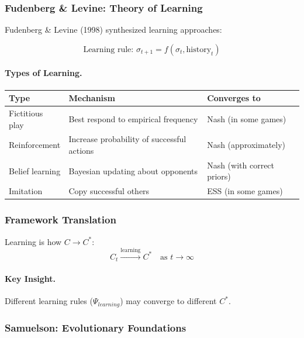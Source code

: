 \subsubsection{Fudenberg \& Levine: Theory of Learning}

Fudenberg \& Levine (1998) synthesized learning approaches:

\begin{equation}
\boxed{
\text{Learning rule: } \sigma_{t+1} = f(\sigma_t, \text{history}_t)
}
\label{eq:learning}
\end{equation}

\paragraph{Types of Learning.}
\begin{center}
\renewcommand{\arraystretch}{1.3}
\begin{tabular}{|l|l|l|}
\hline
\textbf{Type} & \textbf{Mechanism} & \textbf{Converges to} \\
\hline
Fictitious play & Best respond to empirical frequency & Nash (in some games) \\
Reinforcement & Increase probability of successful actions & Nash (approximately) \\
Belief learning & Bayesian updating about opponents & Nash (with correct priors) \\
Imitation & Copy successful others & ESS (in some games) \\
\hline
\end{tabular}
\end{center}

\subsubsection{Framework Translation}

Learning is how $C \to C^*$:
\begin{equation}
C_t \xrightarrow{\text{learning}} C^* \quad \text{as } t \to \infty
\end{equation}

\paragraph{Key Insight.}
Different learning rules ($\Psi_{learning}$) may converge to different $C^*$.

\subsubsection{Samuelson: Evolutionary Foundations}


